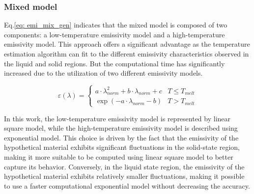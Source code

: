 \subsubsection{Mixed model}
Eq.\ref{eq: emi_mix_gen} indicates that the mixed model is composed of two 
components: a low-temperature emissivity model and a high-temperature emissivity 
model. This approach offers a significant advantage as the temperature 
estimation algorithm can fit to the different emissivity 
characteristics observed in the liquid and solid regions. But the computational 
time has significantly increased due to the utilization of two different 
emissivity models.


\begin{equation}
    \label{eq: emi_mix}
    \varepsilon(\lambda) = \begin{cases} 
      a \cdot \lambda_{norm}^2 + b \cdot \lambda_{norm} + c &   T \leq T_{melt} \\
      \exp(-a \cdot \lambda_{norm} - b) & T > T_{melt}
    \end{cases}
  \end{equation}


In this work, the low-temperature emissivity model is represented by linear 
square model, while the high-temperature emissivity model is described using 
exponential model. This choice is driven by the fact that the emissivity of the 
hypothetical material exhibits significant fluctuations in the solid-state 
region, making it more suitable to be computed using linear 
square model to better capture its behavior. Conversely, in the liquid state 
region, the emissivity of the hypothetical material exhibits relatively smaller 
fluctuations, making it possible to use a faster computational 
exponential model without decreasing the accuracy.


